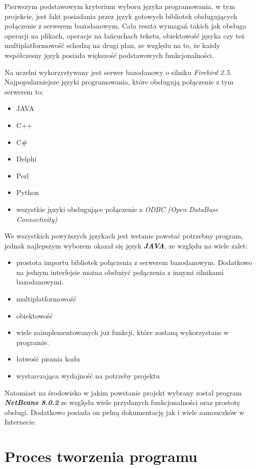 Pierwszym podstawowym kryterium wyboru języka programowania, w tym projekcie, jest fakt posiadania przez język gotowych bibliotek obsługujących połączenie z serwerem bazodanowym. Cała reszta wymagań takich jak obsługa operacji na plikach, operacje na łańcuchach tekstu, obiektowość języka czy też multiplatformowość schodzą na drugi plan, ze względu na to, że każdy współczesny język posiada większość podstawowych funkcjonalności. 
\par Na uczelni wykorzystywany jest serwer bazodanowy o silniku \emph{Firebird 2.5}. Najpopularniejsze języki programowania, które obsługują połączenie z tym serwerem to:
\begin{itemize}
\item JAVA
\item C++
\item C\#
\item Delphi
\item Perl
\item Python
\item wszystkie języki obsługujące połączenie z \emph{ODBC (Open DataBase Connectivity)} 
\end{itemize}
\vspace{5mm}
We wszystkich powyższych językach jest wstanie powstać potrzebny program, jednak najlepszym wyborem okazał się język \emph{\textbf{JAVA}}, ze względu na wiele zalet:
\begin{itemize}
\item prostota importu bibliotek połączenia z serwerem bazodanowym. Dodatkowo na jednym interfejsie można obsłużyć połączenia z innymi silnikami bazodanowymi.
\item multiplatformowość
\item obiektowość
\item wiele zaimplementowanych już funkcji, które zostaną wykorzystane w programie.
\item łatwość pisania kodu
\item wystarczająca wydajność na potrzeby projektu
\end{itemize}
\vspace{5mm}
\par
Natomiast na środowisko w jakim powstanie projekt wybrany został program \emph{\textbf{NetBeans 8.0.2 }} ze względu wiele przydanych funkcjonalności oraz  prostotę obsługi. Dodatkowo posiada on pełną dokumentację jak i wiele samouczków w Internecie. 

\section{Proces tworzenia programu}

